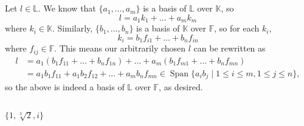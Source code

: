 \documentclass[11pt]{article}
\DeclareMathOperator{\Span}{Span}
\begin{document}
\subsection{} %
Let $l\in\mathbb{L}$.
We know that $\{a_1,\ldots,a_m\}$ is a basis of $\mathbb{L}$ over $\mathbb{K}$, so
\[l=a_1k_1+\ldots+a_mk_m\]
where $k_i\in\mathbb{K}$.
Similarly, $\{b_1,\ldots,b_n\}$ is a basis of $\mathbb{K}$ over $\mathbb{F}$, so for each $k_i$,
\[k_i=b_1f_{i1}+\ldots+b_nf_{in}\]
where $f_{ij}\in\mathbb{F}$.
This means our arbitrarily chosen $l$ can be rewritten as
\begin{align*}
	l&=a_1(b_1f_{11}+\ldots+b_nf_{1n})+\ldots+a_m(b_1f_{m1}+\ldots+b_nf_{mn})\\
	&=a_1b_1f_{11}+a_1b_2f_{12}+\ldots+a_mb_nf_{mn}\in\Span\{a_ib_j\mid1\le i\le m,1\le j\le n\},
\end{align*}
so the above is indeed a basis of $\mathbb{L}$ over $\mathbb{F}$, as desired.


\subsection{} %
$\{1,\sqrt[3]{2},i\}$
\end{document}
